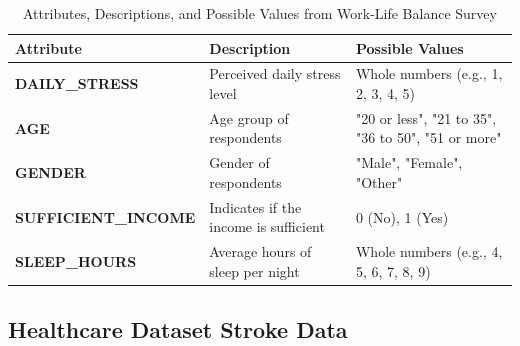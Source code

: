 \documentclass[runningheads]{llncs}
\begin{document}
\begin{enumerate}
\clearpage
\begin{table}[ht]
    \centering
    \caption{Attributes, Descriptions, and Possible Values from Work-Life Balance Survey}
    \label{tab:work_life_balance_attributes}
    \begin{tabular}{|l|p{5cm}|p{4cm}|} 
        \hline
        \textbf{Attribute} & \textbf{Description} & \textbf{Possible Values} \\ 
        \hline
        \textbf{DAILY\_STRESS}      & Perceived daily stress level & Whole numbers (e.g., 1, 2, 3, 4, 5) \\ 
        \hline
        \textbf{AGE}                 & Age group of respondents & "20 or less", "21 to 35", "36 to 50", "51 or more" \\ 
        \hline
        \textbf{GENDER}              & Gender of respondents & "Male", "Female", "Other" \\ 
        \hline
        \textbf{SUFFICIENT\_INCOME}  & Indicates if the income is sufficient & 0 (No), 1 (Yes) \\ 
        \hline
        \textbf{SLEEP\_HOURS}        & Average hours of sleep per night & Whole numbers (e.g., 4, 5, 6, 7, 8, 9) \\ 
        \hline
    \end{tabular}
\end{table}


\subsection{Healthcare Dataset Stroke Data}


\end{enumerate}
\end{document}
